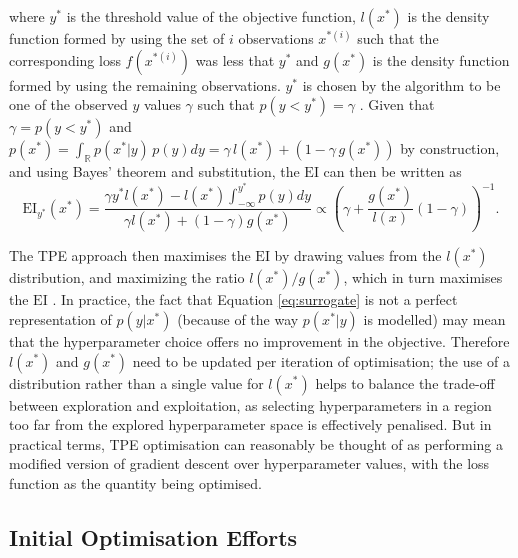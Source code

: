 where $y^*$ is the threshold value of the objective function, $l(x^*)$ is the density function formed by using the set of $i$ observations ${x^{*(i)}}$ such that the corresponding loss $f(x^{*(i)})$ was less that $y^*$ and $g(x^*)$ is the density function formed by using the remaining observations. $y^*$ is chosen by the algorithm to be one of the observed $y$ values $\gamma$ such that $p(y<y^*)=\gamma$ \cite{bergestra}. Given that $\gamma=p(y<y^*)$ and $p(x^*)=\int_{\mathbb{R}}p(x^*|y)\,p(y)dy=\gamma\,l(x^*)+(1-\gamma\,g(x^*))$ by construction, and using Bayes' theorem and substitution, the $\textrm{EI}$ can then be written as 
\begin{equation}
    \textrm{EI}_{y^*}(x^*)=\frac{\gamma y^* \textit{l}(x^*)-\textit{l}(x^*)\int_{-\infty}^{y^*}p(y)dy}{\gamma \textit{l}(x^*)+(1-\gamma) \textit{g}(x^*)} \propto \left( \gamma +\frac{\textit{g}(x^*)}{\textit{l}(x)} (1-\gamma)\right)^{-1}.
\end{equation}

The TPE approach then maximises the $\textrm{EI}$ by drawing values from the $\textit{l}(x^*)$ distribution, and maximizing the ratio $\textit{l}(x^*)/\textit{g}(x^*)$, which in turn maximises the $\textrm{EI}$ \cite{tdshyper}. In practice, the fact that Equation \ref{eq:surrogate} is not a perfect representation of $p(y|x^*)$ (because of the way $p(x^*|y)$ is modelled) may mean that the hyperparameter choice offers no improvement in the objective. Therefore $l(x^*)$ and $g(x^*)$ need to be updated per iteration of optimisation; the use of a distribution rather than a single value for $\textit{l}(x^*)$ helps to balance the trade-off between exploration and exploitation, as selecting hyperparameters in a region too far from the explored hyperparameter space is effectively penalised. But in practical terms, TPE optimisation can reasonably be thought of as performing a modified version of gradient descent over hyperparameter values, with the loss function as the quantity being optimised.

\subsection{Initial Optimisation Efforts}


